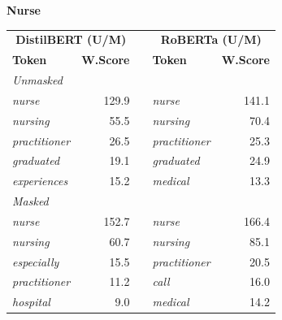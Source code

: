 \documentclass[11pt]{article}
\begin{document}
\vspace{4pt}\noindent\textbf{Nurse}
\begin{center}\scriptsize
\begin{tabular}{lrllr}
\toprule
\multicolumn{2}{c}{\textbf{DistilBERT (U/M)}} & & \multicolumn{2}{c}{\textbf{RoBERTa (U/M)}} \\
\textbf{Token} & \textbf{W.Score} & & \textbf{Token} & \textbf{W.Score} \\
\midrule
\multicolumn{5}{l}{\textit{Unmasked}} \\
\emph{nurse} & 129.9 & & \emph{nurse} & 141.1 \\
\emph{nursing} & 55.5 & & \emph{nursing} & 70.4 \\
\emph{practitioner} & 26.5 & & \emph{practitioner} & 25.3 \\
\emph{graduated} & 19.1 & & \emph{graduated} & 24.9 \\
\emph{experiences} & 15.2 & & \emph{medical} & 13.3 \\
\multicolumn{5}{l}{\textit{Masked}} \\
\emph{nurse} & 152.7 & & \emph{nurse} & 166.4 \\
\emph{nursing} & 60.7 & & \emph{nursing} & 85.1 \\
\emph{especially} & 15.5 & & \emph{practitioner} & 20.5 \\
\emph{practitioner} & 11.2 & & \emph{call} & 16.0 \\
\emph{hospital} & 9.0 & & \emph{medical} & 14.2 \\
\bottomrule
\end{tabular}
\end{center}
\end{document}
